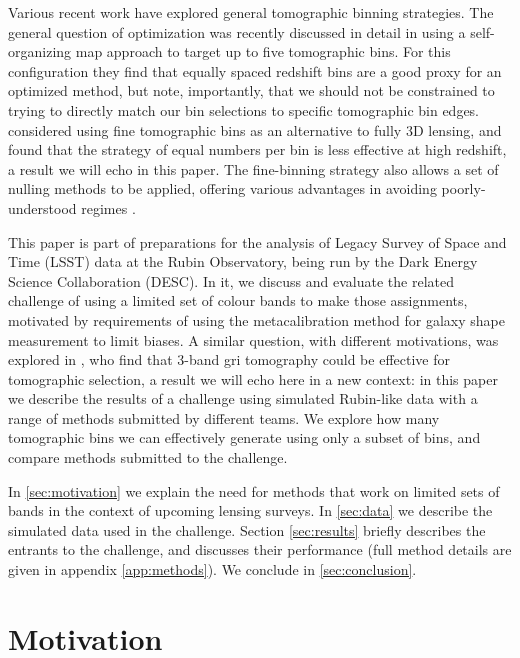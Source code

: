 \documentclass[twocolumn,twocolappendix]{aastex63}
\begin{document}
Various recent work have explored general tomographic binning strategies. The general question of optimization
was recently discussed in detail
in \citet{rainbow} using a self-organizing map approach to target up to five tomographic bins.  For this
configuration they find that equally spaced redshift bins are a good proxy
for an optimized method, but note, importantly, that we should not be constrained to trying to directly
match our bin selections to specific tomographic bin edges. \citet{taylor18} considered using
fine tomographic bins as an alternative to fully 3D lensing, and found that the strategy of equal numbers
per bin is less effective at high redshift, a result we will echo in this paper. The fine-binning strategy
also allows a set of nulling methods to be applied, offering various advantages in avoiding poorly-understood
regimes \citep{taylor18b,bnt,xcut}.

This paper is part of preparations for the analysis of Legacy Survey of Space and Time (LSST) data at the Rubin Observatory, being run by the Dark Energy Science Collaboration (DESC).
In it, we discuss and evaluate the related challenge
of using a limited set of colour bands to make those assignments, motivated by requirements of using the
metacalibration method for galaxy shape measurement to limit biases.  
A similar question, with different motivations, was explored in \citet{jain}, who find that 3-band 
gri tomography could be effective for tomographic selection, a result we will echo here in a new context: in this paper we describe the results of a 
challenge using simulated Rubin-like data with a range of methods submitted by different teams.  We explore how many tomographic bins we can effectively generate using only a subset of bins, and compare methods submitted to the challenge.

In \autoref{sec:motivation} we explain the need for methods that work on limited sets of bands in the context of upcoming lensing surveys. In \autoref{sec:data} we describe the simulated data used in the challenge.
Section \ref{sec:results} briefly describes the entrants to the challenge, and discusses their performance (full
method details are given in appendix \ref{app:methods}).
 We conclude in \autoref{sec:conclusion}.

\section{Motivation}
\label{sec:motivation}
\end{document}
